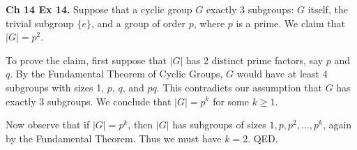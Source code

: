 \documentclass[11pt]{article}
\begin{document}
{\bf Ch 14 Ex 14.} Suppose that a cyclic group $G$ exactly 3 subgroups: $G$
itself, the trivial subgroup $\{e\}$, and a group of order $p$, where
$p$ is a prime. We claim that $|G|=p^2$.

To prove the claim, first suppose that $|G|$ has 2 distinct prime
factors, say $p$ and $q$. By the Fundamental Theorem of Cyclic Groups,
$G$ would have at least 4 subgroups with sizes 1, $p$, $q$, and $pq$. This contradicts
our assumption that $G$ has exactly 3 subgroups. We conclude that
$|G|=p^k$ for some $k\geq 1$. 

Now observe that if $|G|=p^k$, then $|G|$ has subgroups of sizes
$1,p,p^2,\ldots,p^k$, again by the Fundamental Theorem. Thus we must
have $k=2$. QED.
\end{document}

